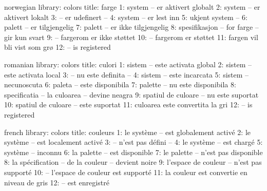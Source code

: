 \startmessages  norwegian  library: colors
  title: farge
      1: system -- er aktivert globalt
      2: system -- er aktivert lokalt
      3: -- er udefinert --
      4: system -- er lest inn
      5: ukjent system --
      6: palett -- er tilgjengelig
      7: palett -- er ikke tilgjengelig
      8: spesifikasjon -- for farge -- gir kun svart
      9: -- fargerom er ikke støttet
     10: -- fargerom er støttet
     11: fargen vil bli vist som grø
     12: -- is registered
\stopmessages

\startmessages  romanian  library: colors
  title: culori
      1: sistem -- este activata global
      2: sistem -- este activata local
      3: -- nu este definita --
      4: sistem -- este incarcata
      5: sistem -- necunoscuta
      6: paleta -- este disponibila
      7: palette -- nu este disponibila
      8: specificatia -- la culoarea -- devine neagra
      9: spatiul de culoare -- nu este suportat
     10: spatiul de culoare -- este suportat
     11: culoarea este convertita la gri
     12: -- is registered
\stopmessages

\startmessages  french  library: colors
  title: couleurs
      1: le système -- est globalement activé
      2: le système -- est localement activé
      3: -- n'est pas défini --
      4: le système -- est chargé
      5: système -- inconnu
      6: la palette -- est disponible
      7: le palette -- n'est pas disponible
      8: la spécification -- de la couleur -- devient noire
      9: l'espace de couleur -- n'est pas supporté
     10: -- l'espace de couleur est supporté
     11: la couleur est convertie en niveau de gris
     12: -- est enregistré
\stopmessages


\newdimen{}
\newcount{}


